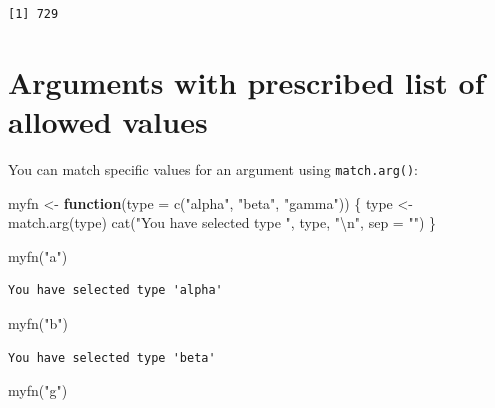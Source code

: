 \documentclass[
]{book}
\newenvironment{Shaded}{\begin{snugshade}}{\end{snugshade}}
\newcommand{\AttributeTok}[1]{\textcolor[rgb]{0.77,0.63,0.00}{#1}}
\newcommand{\ControlFlowTok}[1]{\textcolor[rgb]{0.13,0.29,0.53}{\textbf{#1}}}
\newcommand{\FunctionTok}[1]{\textcolor[rgb]{0.00,0.00,0.00}{#1}}
\newcommand{\NormalTok}[1]{#1}
\newcommand{\OtherTok}[1]{\textcolor[rgb]{0.56,0.35,0.01}{#1}}
\newcommand{\SpecialCharTok}[1]{\textcolor[rgb]{0.00,0.00,0.00}{#1}}
\newcommand{\StringTok}[1]{\textcolor[rgb]{0.31,0.60,0.02}{#1}}
\begin{document}
\begin{verbatim}
[1] 729
\end{verbatim}

\hypertarget{arguments-with-prescribed-list-of-allowed-values}{%
\section{Arguments with prescribed list of allowed values}\label{arguments-with-prescribed-list-of-allowed-values}}

You can match specific values for an argument using \texttt{match.arg()}:

\begin{Shaded}
\begin{Highlighting}[]
\NormalTok{myfn }\OtherTok{\textless{}{-}} \ControlFlowTok{function}\NormalTok{(}\AttributeTok{type =} \FunctionTok{c}\NormalTok{(}\StringTok{"alpha"}\NormalTok{, }\StringTok{"beta"}\NormalTok{, }\StringTok{"gamma"}\NormalTok{)) \{}
\NormalTok{  type }\OtherTok{\textless{}{-}} \FunctionTok{match.arg}\NormalTok{(type)}
  \FunctionTok{cat}\NormalTok{(}\StringTok{"You have selected type \textquotesingle{}"}\NormalTok{, type, }\StringTok{"\textquotesingle{}}\SpecialCharTok{\textbackslash{}n}\StringTok{"}\NormalTok{, }\AttributeTok{sep =} \StringTok{""}\NormalTok{)}
\NormalTok{\}}

\FunctionTok{myfn}\NormalTok{(}\StringTok{"a"}\NormalTok{)}
\end{Highlighting}
\end{Shaded}

\begin{verbatim}
You have selected type 'alpha'
\end{verbatim}

\begin{Shaded}
\begin{Highlighting}[]
\FunctionTok{myfn}\NormalTok{(}\StringTok{"b"}\NormalTok{)}
\end{Highlighting}
\end{Shaded}

\begin{verbatim}
You have selected type 'beta'
\end{verbatim}

\begin{Shaded}
\begin{Highlighting}[]
\FunctionTok{myfn}\NormalTok{(}\StringTok{"g"}\NormalTok{)}
\end{Highlighting}
\end{Shaded}
\end{document}
